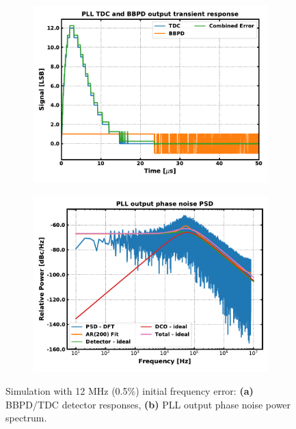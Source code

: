 	\begin{figure}[htb!]
	    \centering
	    \begin{subfigure}{0.5\textwidth}
	        \centering
	        \center\includegraphics[width=1.0\textwidth, angle=0]{figs/trans_tdc_bbpd.pdf}
	        \caption{ }
	        \label{fig:trans_det}
	    \end{subfigure}%
	    \begin{subfigure}{0.5\textwidth}
	        \centering
	        \center\includegraphics[width=1.0\textwidth, angle=0]{figs/trans_phase_noise.pdf}
	        \caption{ }
	        \label{fig:trans_phase_noise}
	    \end{subfigure}
	    \label{fig:trans_sim2}
	    \caption{Simulation with 12 MHz (0.5\%) initial frequency error: \textbf{(a)} BBPD/TDC detector responses, \textbf{(b)} PLL output phase noise power spectrum.}
	\end{figure}
\pagebreak


